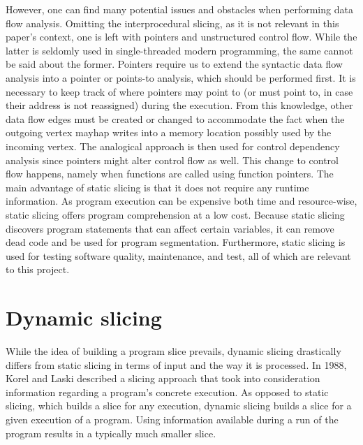 \lipsum[11]

However, one can find many potential issues and obstacles when performing 
data flow analysis. 
Omitting the interprocedural slicing, as it is not relevant in this paper's
context, one is left with pointers and unstructured control flow.
While the latter is seldomly used in single-threaded modern programming, 
the same cannot be said about the former. 
Pointers require us to extend the syntactic data flow analysis 
into a pointer or points-to analysis, which should be performed first. 
It is necessary to keep track of where pointers may point to (or must point to,
in case their address is not reassigned) during the execution. 
From this knowledge, other data flow edges must be created or
changed to accommodate the fact when the outgoing vertex mayhap writes
into a memory location possibly used by the incoming vertex. 
The analogical approach is then used for control dependency analysis since 
pointers might alter control flow as well. 
This change to control flow happens, namely when functions are called using 
function pointers.
The main advantage of static slicing is that it does not require
any runtime information. 
As program execution can be expensive both time and resource-wise, 
static slicing offers program comprehension at a low cost. 
Because static slicing discovers program statements that can affect 
certain variables, it can remove dead code and be used for program segmentation. 
Furthermore, static slicing is used for testing software quality, maintenance, 
and test, all of which are relevant to this project.

\section{Dynamic slicing}

While the idea of building a program slice prevails, dynamic slicing 
drastically differs from static slicing in terms of input and the way
it is processed. 
In 1988, Korel and Laski described a slicing approach that took into 
consideration information regarding a program's concrete execution. 
As opposed to static slicing, which builds a slice for any execution, 
dynamic slicing builds a slice for a given execution of a program. 
Using information available during a run of the program 
results in a typically much smaller slice.

\lipsum[11]

